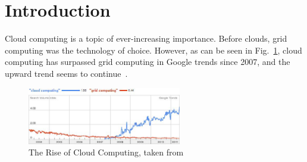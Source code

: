 \documentclass[a4paper]{llncs}
\begin{document}
\section{Introduction}
Cloud computing is a topic of ever-increasing importance. Before clouds, grid computing was the technology of choice. However, as can be seen in Fig.~\ref{fig:rise_cloud}, cloud computing has surpassed grid computing in Google trends since 2007, and the upward trend seems to continue~\cite{Alhamad11}.

\begin{figure}[Ht]
	\centering
		\includegraphics[width=0.6\textwidth]{figs/rise_cloud.png}
	\caption{The Rise of Cloud Computing, taken from~\cite{Alhamad11}}
	\label{fig:rise_cloud}
\end{figure}
\end{document}
